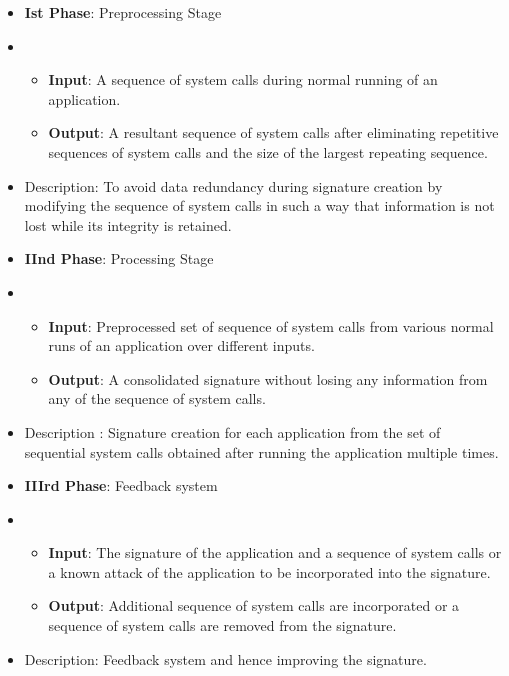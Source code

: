 \begin{itemize}
    \item[] \textbf{Ist Phase}: Preprocessing Stage
    \item[] \begin{itemize}
                \item[] \textbf{Input}: A sequence of system calls during normal running of an application. 
                \item[] \textbf{Output}: A resultant sequence of system calls after eliminating repetitive sequences of system calls and the size of the largest repeating sequence.
            \end{itemize}
    \item[] Description: To avoid data redundancy during signature creation by modifying the sequence of system calls in such a way that information is not lost while its integrity is retained.

    \item[] \textbf{IInd Phase}: Processing Stage
    \item[] \begin{itemize}
                \item[] \textbf{Input}: Preprocessed set of sequence of system calls from various normal runs of an application over different inputs.
                \item[] \textbf{Output}: A consolidated signature without losing any information from any of the sequence of system calls.
            \end{itemize}
    \item[] Description : Signature creation for each application from the set of sequential system calls obtained after running the application multiple times.    
    \item[] \textbf{IIIrd Phase}: Feedback system
    \item[] \begin{itemize}
                \item[] \textbf{Input}: The signature of the application and a sequence of system calls or a known attack of the application to be incorporated into the signature.
                \item[] \textbf{Output}: Additional sequence of system calls are incorporated or a sequence of system calls are removed from the signature.
            \end{itemize}
    \item[] Description: Feedback system and hence improving the signature.


\end{itemize}
